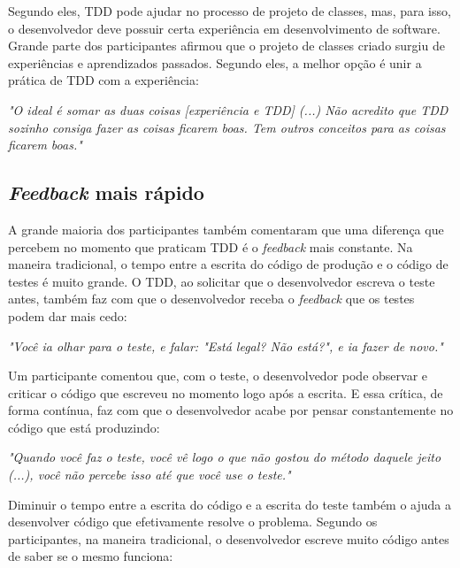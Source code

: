 \documentclass[conference]{IEEEtran}
\begin{document}
Segundo eles, TDD pode ajudar no processo de projeto de classes, mas, para isso,
o desenvolvedor deve possuir certa experiência em desenvolvimento de software. 
Grande parte dos participantes afirmou que o 
projeto de classes criado surgiu de experiências e aprendizados passados.
Segundo eles, a melhor opção é unir a prática de TDD com a experiência:

\begin{framed}
\textit{"O ideal é somar as duas coisas [experiência e TDD] (...) 
Não acredito que TDD sozinho consiga fazer as coisas ficarem boas. Tem outros conceitos
para as coisas ficarem boas."}
\end{framed}

\subsection{\textit{Feedback} mais rápido}

A grande maioria dos participantes também comentaram que uma diferença que percebem
no momento que praticam TDD é o \textit{feedback} mais constante. Na maneira
tradicional, o tempo entre a escrita do código de produção e o código
de testes é muito grande. O TDD, ao solicitar que o desenvolvedor
escreva o teste antes, também faz com que o desenvolvedor receba o \textit{feedback} que
os testes podem dar mais cedo:

\begin{framed}
\textit{"Você ia olhar para o teste, e falar: "Está legal? Não está?", e ia fazer de novo."}
\end{framed}

Um participante comentou que, com o teste, o desenvolvedor pode observar
e criticar o código que escreveu no momento logo após a escrita.
E essa crítica, de forma contínua, faz com que o desenvolvedor acabe
por pensar constantemente no código que está produzindo:

\begin{framed}
\textit{"Quando você faz o teste, você vê logo o que não gostou do método daquele jeito (...), você
não percebe isso até que você use o teste."}
\end{framed}

Diminuir o tempo entre a escrita do código e a escrita do teste também o ajuda a desenvolver código
que efetivamente resolve o problema. Segundo os participantes, na maneira tradicional, 
o desenvolvedor escreve muito código antes de saber se o mesmo funciona:
\end{document}
